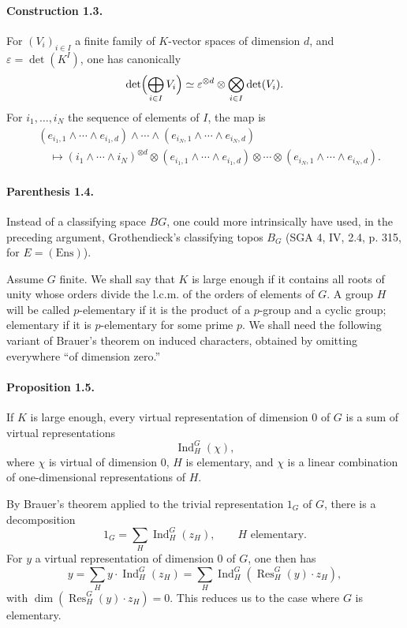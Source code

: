 \documentclass[10pt]{article}
\newcommand{\Ind}{\operatorname{Ind}}
\newcommand{\Res}{\operatorname{Res}}
\providecommand{\Ind}{\operatorname{Ind}}
\begin{document}
\paragraph{Construction 1.3.} For \((V_i)_{i\in I}\) a finite family of \(K\)-vector spaces of dimension \(d\), and \(\varepsilon=\det(K^I)\), one has canonically
\[
\det\Bigl(\bigoplus_{i\in I}V_i\Bigr)\simeq
\varepsilon^{\otimes d}\otimes\bigotimes_{i\in I}\det(V_i).
\]
For \(i_1,\ldots,i_N\) the sequence of elements of \(I\), the map is
\[
\begin{aligned}
&(e_{i_1,1}\wedge\cdots\wedge e_{i_1,d})\wedge\cdots\wedge
(e_{i_N,1}\wedge\cdots\wedge e_{i_N,d}) \\
&\quad\longmapsto
(i_1\wedge\cdots\wedge i_N)^{\otimes d}\otimes
(e_{i_1,1}\wedge\cdots\wedge e_{i_1,d})\otimes\cdots\otimes
(e_{i_N,1}\wedge\cdots\wedge e_{i_N,d}).
\end{aligned}
\]

\paragraph{Parenthesis 1.4.} Instead of a classifying space \(BG\), one could more intrinsically have used, in the preceding argument, Grothendieck's classifying topos \(B_G\) (SGA 4, IV, 2.4, p. 315, for \(E=(\mathrm{Ens})\)).

Assume \(G\) finite. We shall say that \(K\) is large enough if it contains all roots of unity whose orders divide the l.c.m. of the orders of elements of \(G\). A group \(H\) will be called \(p\)-elementary if it is the product of a \(p\)-group and a cyclic group; elementary if it is \(p\)-elementary for some prime \(p\). We shall need the following variant of Brauer's theorem on induced characters, obtained by omitting everywhere ``of dimension zero.''

\paragraph{Proposition 1.5.} If \(K\) is large enough, every virtual representation of dimension \(0\) of \(G\) is a sum of virtual representations
\[
\Ind_H^G(\chi),
\]
where \(\chi\) is virtual of dimension \(0\), \(H\) is elementary, and \(\chi\) is a linear combination of one-dimensional representations of \(H\).

By Brauer's theorem applied to the trivial representation \(1_G\) of \(G\), there is a decomposition
\[
1_G=\sum_H \Ind_H^G(z_H),
\qquad H\text{ elementary}.
\]
For \(y\) a virtual representation of dimension \(0\) of \(G\), one then has
\[
y=\sum_H y\cdot \Ind_H^G(z_H)
  =\sum_H\Ind_H^G(\Res_H^G(y)\cdot z_H),
\]
with \(\dim(\Res_H^G(y)\cdot z_H)=0\). This reduces us to the case where \(G\) is elementary.
\end{document}
